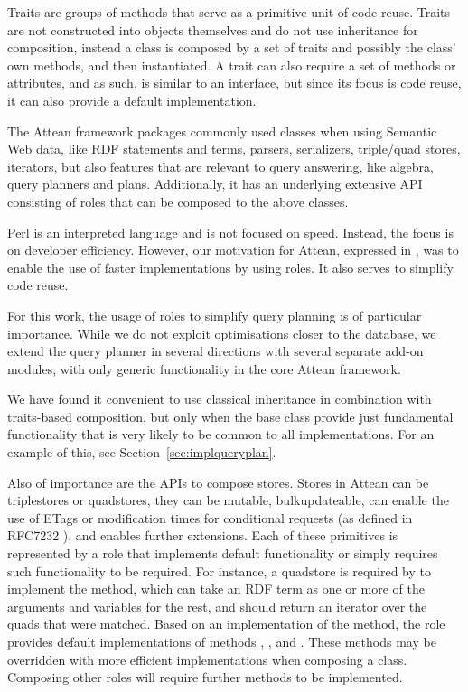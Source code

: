 Traits are groups of methods that serve as a primitive unit of code
reuse. Traits are not constructed into objects themselves and do not
use inheritance for composition, instead a class is composed by a set
of traits and possibly the class' own methods, and then
instantiated. A trait can also require a set of methods or attributes,
and as such, is similar to an interface, but since its focus is code
reuse, it can also provide a default implementation.

The Attean framework packages commonly used classes when using
Semantic Web data, like RDF statements and terms, parsers,
serializers, triple/quad stores, iterators, but also features that are
relevant to query answering, like algebra, query planners and
plans. Additionally, it has an underlying extensive API consisting of
roles that can be composed to the above classes.

Perl is an interpreted language and is not focused on speed. Instead,
the focus is on developer efficiency. However, our motivation for
Attean, expressed in \cite{williamspushing}, was to enable the use
of faster implementations by using roles. It also serves to simplify 
code reuse.

For this work, the usage of roles to simplify query planning is of
particular importance. While we do not exploit optimisations closer to
the database, we extend the query planner in several directions with
several separate add-on modules, with only generic functionality in
the core Attean framework.

We have found it convenient to use classical inheritance in
combination with traits-based composition, but only when the base
class provide just fundamental functionality that is very likely to be
common to all implementations. For an example of this, see
Section~\ref{sec:implqueryplan}.

Also of importance are the APIs to compose stores. Stores in Attean
can be triplestores or quadstores, they can be mutable,
bulkupdateable, can enable the use of ETags or modification times for
conditional requests (as defined in RFC7232 \cite{rfc7234}), and
enables further extensions. Each of these primitives is represented
by a role that implements default functionality or simply requires
such functionality to be required. For instance, a quadstore is
required by  to implement the
 method, which can take an RDF term as one or more
of the arguments and variables for the rest, and should return an
iterator over the quads that were matched. Based on an implementation
of the  method, the 
role provides default implementations of methods ,
,  and
. These methods may be overridden with more efficient
implementations when composing a class. Composing other roles will
require further methods to be implemented.

